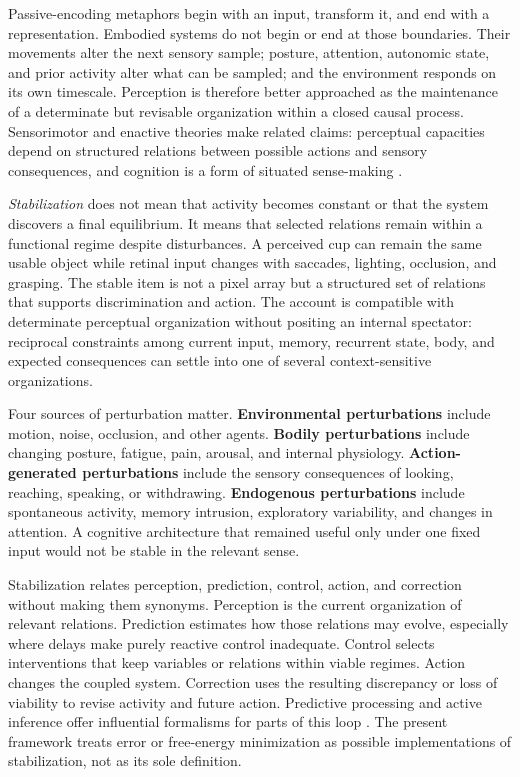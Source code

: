 \documentclass[
  11pt,
  a4paper,
]{article}
\begin{document}
Passive-encoding metaphors begin with an input, transform it, and end
with a representation. Embodied systems do not begin or end at those
boundaries. Their movements alter the next sensory sample; posture,
attention, autonomic state, and prior activity alter what can be
sampled; and the environment responds on its own timescale. Perception
is therefore better approached as the maintenance of a determinate but
revisable organization within a closed causal process. Sensorimotor and
enactive theories make related claims: perceptual capacities depend on
structured relations between possible actions and sensory consequences,
and cognition is a form of situated sense-making
\citep{oregan2001, noe2004, varela1991, thompson2007}.

\emph{Stabilization} does not mean that activity becomes constant or
that the system discovers a final equilibrium. It means that selected
relations remain within a functional regime despite disturbances. A
perceived cup can remain the same usable object while retinal input
changes with saccades, lighting, occlusion, and grasping. The stable
item is not a pixel array but a structured set of relations that
supports discrimination and action. The account is compatible with
determinate perceptual organization without positing an internal
spectator: reciprocal constraints among current input, memory, recurrent
state, body, and expected consequences can settle into one of several
context-sensitive organizations.

Four sources of perturbation matter. \textbf{Environmental
perturbations} include motion, noise, occlusion, and other agents.
\textbf{Bodily perturbations} include changing posture, fatigue, pain,
arousal, and internal physiology. \textbf{Action-generated
perturbations} include the sensory consequences of looking, reaching,
speaking, or withdrawing. \textbf{Endogenous perturbations} include
spontaneous activity, memory intrusion, exploratory variability, and
changes in attention. A cognitive architecture that remained useful only
under one fixed input would not be stable in the relevant sense.

Stabilization relates perception, prediction, control, action, and
correction without making them synonyms. Perception is the current
organization of relevant relations. Prediction estimates how those
relations may evolve, especially where delays make purely reactive
control inadequate. Control selects interventions that keep variables or
relations within viable regimes. Action changes the coupled system.
Correction uses the resulting discrepancy or loss of viability to revise
activity and future action. Predictive processing and active inference
offer influential formalisms for parts of this loop
\citep{clark2013, friston2010}. The present framework treats error or
free-energy minimization as possible implementations of stabilization,
not as its sole definition.
\end{document}
